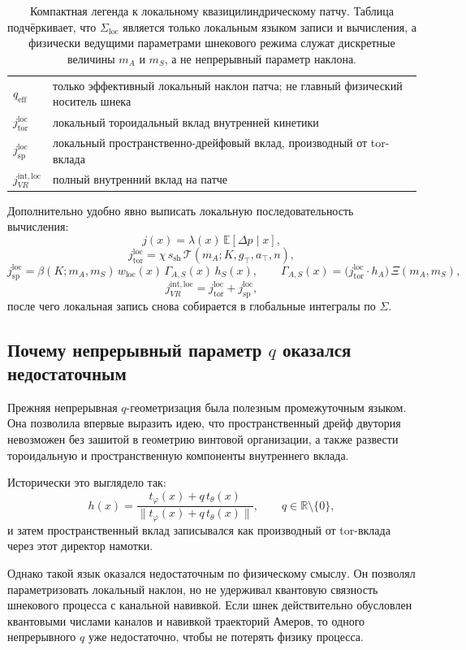 \begin{table}[htbp]
\begin{tabular}{>{\raggedright\arraybackslash}p{2.2cm} >{\raggedright\arraybackslash}p{9.8cm}}
\(q_{\mathrm{eff}}\) & только эффективный локальный наклон патча; не главный физический носитель шнека \\
\(j_{\mathrm{tor}}^{\mathrm{loc}}\) & локальный тороидальный вклад внутренней кинетики \\
\(j_{\mathrm{sp}}^{\mathrm{loc}}\) & локальный пространственно-дрейфовый вклад, производный от tor-вклада \\
\(j_{VR}^{\mathrm{int,loc}}\) & полный внутренний вклад на патче \\
\bottomrule
\end{tabular}
\caption{
Компактная легенда к локальному квазицилиндрическому патчу. 
Таблица подчёркивает, что \(\Sigma_{\mathrm{loc}}\) является только локальным языком записи и вычисления, а физически ведущими параметрами шнекового режима служат дискретные величины \(m_A\) и \(m_S\), а не непрерывный параметр наклона.
}
\label{tab:quasi_cyl_patch_legend}
\end{table}

Дополнительно удобно явно выписать локальную последовательность вычисления:
\[
j(x)=\lambda(x)\,\mathbb{E}[\Delta p\mid x],
\]
\[
j_{\mathrm{tor}}^{\mathrm{loc}}
=
\chi\, s_{\mathrm{sh}}\,
\mathcal{T}(m_A;K,g_\top,a_\top,n),
\]
\[
j_{\mathrm{sp}}^{\mathrm{loc}}
=
\beta(K;m_A,m_S)\,
w_{\mathrm{loc}}(x)\,
\Gamma_{A,S}(x)\,
h_S(x),
\qquad
\Gamma_{A,S}(x)=
\bigl(j_{\mathrm{tor}}^{\mathrm{loc}}\cdot h_A\bigr)\,
\Xi(m_A,m_S),
\]
\[
j_{VR}^{\mathrm{int,loc}}
=
j_{\mathrm{tor}}^{\mathrm{loc}}
+
j_{\mathrm{sp}}^{\mathrm{loc}},
\]
после чего локальная запись снова собирается в глобальные интегралы по \(\Sigma\).

\subsection{Почему непрерывный параметр \(q\) оказался недостаточным}

Прежняя непрерывная \(q\)-геометризация была полезным промежуточным языком. Она позволила впервые выразить идею, что пространственный дрейф двутория невозможен без зашитой в геометрию винтовой организации, а также развести тороидальную и пространственную компоненты внутреннего вклада.

Исторически это выглядело так:
\[
h(x)=\frac{t_\varphi(x)+q\,t_\theta(x)}{\|t_\varphi(x)+q\,t_\theta(x)\|},
\qquad
q\in\mathbb{R}\setminus\{0\},
\]
и затем пространственный вклад записывался как производный от tor-вклада через этот директор намотки.

Однако такой язык оказался недостаточным по физическому смыслу. Он позволял параметризовать локальный наклон, но не удерживал квантовую связность шнекового процесса с канальной навивкой. Если шнек действительно обусловлен квантовыми числами каналов и навивкой траекторий Амеров, то одного непрерывного \(q\) уже недостаточно, чтобы не потерять физику процесса.

